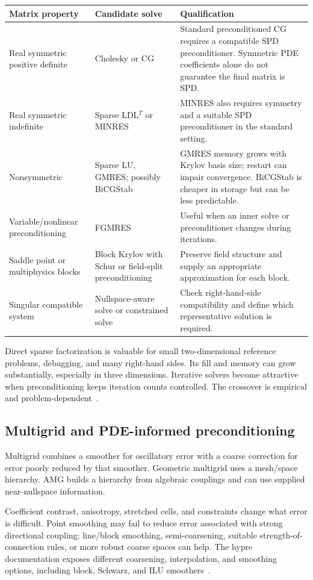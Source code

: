 \documentclass[11pt,a4paper]{article}
\begin{document}
\begin{longtable}{P{0.23\textwidth}P{0.27\textwidth}P{0.42\textwidth}}
\toprule
Matrix property & Candidate solve & Qualification\\
\midrule\endhead
Real symmetric positive definite & Cholesky or CG & Standard preconditioned CG requires a compatible SPD preconditioner. Symmetric PDE coefficients alone do not guarantee the final matrix is SPD.\\
Real symmetric indefinite & Sparse LDL$^T$ or MINRES & MINRES also requires symmetry and a suitable SPD preconditioner in the standard setting.\\
Nonsymmetric & Sparse LU, GMRES; possibly BiCGStab & GMRES memory grows with Krylov basis size; restart can impair convergence. BiCGStab is cheaper in storage but can be less predictable.\\
Variable/nonlinear preconditioning & FGMRES & Useful when an inner solve or preconditioner changes during iterations.\\
Saddle point or multiphysics blocks & Block Krylov with Schur or field-split preconditioning & Preserve field structure and supply an appropriate approximation for each block.\\
Singular compatible system & Nullspace-aware solve or constrained solve & Check right-hand-side compatibility and define which representative solution is required.\\
\bottomrule
\end{longtable}

Direct sparse factorization is valuable for small two-dimensional reference problems, debugging, and many right-hand sides. Its fill and memory can grow substantially, especially in three dimensions. Iterative solvers become attractive when preconditioning keeps iteration counts controlled. The crossover is empirical and problem-dependent~\cite{elman}.

\subsection{Multigrid and PDE-informed preconditioning}
Multigrid combines a smoother for oscillatory error with a coarse correction for error poorly reduced by that smoother. Geometric multigrid uses a mesh/space hierarchy. AMG builds a hierarchy from algebraic couplings and can use supplied near-nullspace information.

Coefficient contrast, anisotropy, stretched cells, and constraints change what error is difficult. Point smoothing may fail to reduce error associated with strong directional coupling; line/block smoothing, semi-coarsening, suitable strength-of-connection rules, or more robust coarse spaces can help. The hypre documentation exposes different coarsening, interpolation, and smoothing options, including block, Schwarz, and ILU smoothers~\cite{hypre}.
\end{document}
